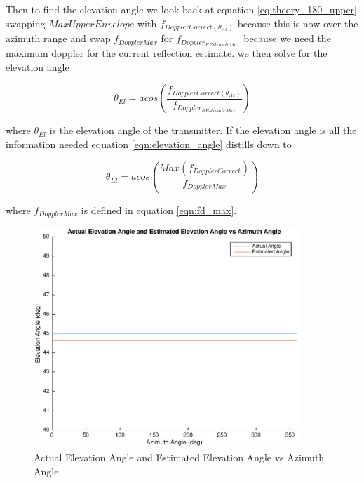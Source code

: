 Then to find the elevation angle we look back at equation \ref{eq:theory_180_upper} swapping $MaxUpperEnvelope$ with $f_{DopplerCorrect(\theta_{Az})}$ because this is now over the azimuth range and swap $f_{DopplerMax}$ for $f_{Doppler_{R Estimate Max}}$ because we need the maximum doppler for the current reflection estimate. we then solve for the elevation angle

\begin{equation}
	\theta_{El} = acos\left(\frac{f_{DopplerCorrect(\theta_{Az})}}{f_{Doppler_{R Estimate Max}}}\right)
	\label{eqn:elevation_angle}
\end{equation}

where $\theta_{El}$ is the elevation angle of the transmitter. If the elevation angle is all the information needed equation \ref{eqn:elevation_angle} distills down to

\begin{equation}
	\theta_{El} = acos\left(\frac{Max(f_{DopplerCorrect})}{f_{DopplerMax}}\right)
	\label{eqn:elevation_angle_only}
\end{equation}

where $f_{DopplerMax}$ is defined in equation \ref{eqn:fd_max}.

\begin{figure}
	\begin{center}
		\includegraphics[width=10cm]{images/results/Elevation_angle_comparason_Azimuth_range.eps}
		\caption{Actual Elevation Angle and Estimated Elevation Angle vs Azimuth Angle}
		\label{fig:elevation_comparason_azimuth_range}
	\end{center}
\end{figure}

